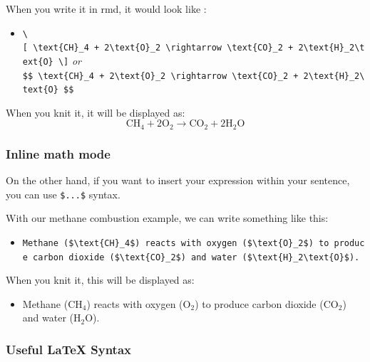 \documentclass[
]{book}
\providecommand{\tightlist}{%
  \setlength{\itemsep}{0pt}\setlength{\parskip}{0pt}}
\begin{document}
When you write it in rmd, it would look like :

\begin{itemize}
\tightlist
\item
  \texttt{\textbackslash{}{[}\ \textbackslash{}text\{CH\}\_4\ +\ 2\textbackslash{}text\{O\}\_2\ \textbackslash{}rightarrow\ \textbackslash{}text\{CO\}\_2\ +\ 2\textbackslash{}text\{H\}\_2\textbackslash{}text\{O\}\ \textbackslash{}{]}} \emph{or} \texttt{\$\$\ \textbackslash{}text\{CH\}\_4\ +\ 2\textbackslash{}text\{O\}\_2\ \textbackslash{}rightarrow\ \textbackslash{}text\{CO\}\_2\ +\ 2\textbackslash{}text\{H\}\_2\textbackslash{}text\{O\}\ \$\$}
\end{itemize}

When you knit it, it will be displayed as:\\
\[ \text{CH}_4 + 2\text{O}_2 \rightarrow \text{CO}_2 + 2\text{H}_2\text{O} \]

\hypertarget{inline-math-mode}{%
\subsubsection{Inline math mode}\label{inline-math-mode}}

On the other hand, if you want to insert your expression within your sentence, you can use \texttt{\$...\$} syntax.

With our methane combustion example, we can write something like this:

\begin{itemize}
\tightlist
\item
  \texttt{Methane\ (\$\textbackslash{}text\{CH\}\_4\$)\ reacts\ with\ oxygen\ (\$\textbackslash{}text\{O\}\_2\$)\ to\ produce\ carbon\ dioxide\ (\$\textbackslash{}text\{CO\}\_2\$)\ and\ water\ (\$\textbackslash{}text\{H\}\_2\textbackslash{}text\{O\}\$).}
\end{itemize}

When you knit it, this will be displayed as:

\begin{itemize}
\tightlist
\item
  Methane (\(\text{CH}_4\)) reacts with oxygen (\(\text{O}_2\)) to produce carbon dioxide (\(\text{CO}_2\)) and water (\(\text{H}_2\text{O}\)).
\end{itemize}

\hypertarget{useful-latex-syntax}{%
\subsubsection{Useful LaTeX Syntax}\label{useful-latex-syntax}}
\end{document}
